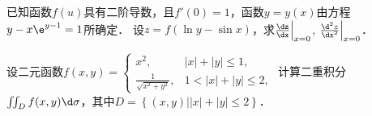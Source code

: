 \documentclass[plain,noanswer,medmath]{../../template/jnuexam}
\begin{document}
\begin{problem}[points=10]
已知函数$f(u)$具有二阶导数，且$f'(0) = 1$，函数$y = y(x)$由方程$y - x\e^{y - 1} = 1$所确定．
设$z = f(\ln y - \sin x)$，求$\frac{\dz}{\dx}\Big|_{x = 0}$, $\frac{\d^2z}{\dx^2}\Big|_{x = 0}$．
\end{problem}




\begin{problem}[points=11]
设二元函数$f(x,y) = \begin{cases}
  x^2, & |x| + |y| \le 1, \\
  \frac{1}{\sqrt{x^2 + y^2}}, & 1 < |x| + |y| \le 2,
\end{cases}$
计算二重积分$\iint_D f(x,y)\d\sigma$，其中$D = \left\{(x,y)\left| |x| + |y| \le 2 \right. \right\}$．
\end{problem}




\end{document}
